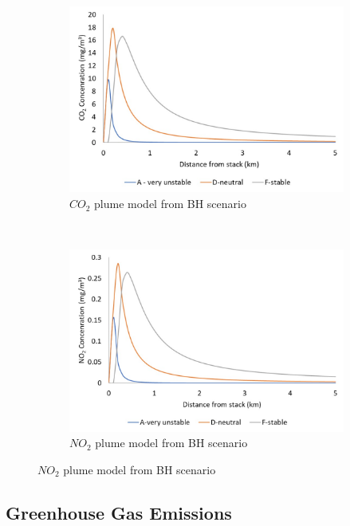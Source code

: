 \begin{figure}[t!]
    \centering
    \begin{subfigure}[t]{0.5\textwidth}
        \centering
        \includegraphics[width=\linewidth]{figures/CO2plumeBH.jpg}
        \caption{$CO_2$ plume model from BH scenario}
    \end{subfigure}%
    ~ 
    \begin{subfigure}[t]{0.5\textwidth}
        \centering
        \includegraphics[width=\linewidth]{figures/NO2plumeBH.jpg}
        \caption{$NO_2$ plume model from BH scenario}
    \end{subfigure}
\end{figure}


\subsection{Greenhouse Gas Emissions}

